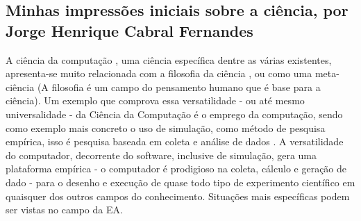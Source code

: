 \subsection{Minhas impressões iniciais sobre a ciência, por Jorge Henrique Cabral Fernandes}

A ciência da computação \citep{baldwin_three-fold_1994}, uma ciência específica dentre as várias existentes, apresenta-se muito relacionada com a filosofia da ciência \citep{floridi_blackwell_2004}, ou como uma meta-ciência (A filosofia é um campo do pensamento humano que é base para a ciência). Um exemplo que comprova essa versatilidade - ou até mesmo universalidade - da Ciência da Computação é o emprego da computação, sendo como exemplo mais concreto o uso de simulação, como método de pesquisa empírica, isso é pesquisa baseada em coleta e análise de dados \cite{marcolino_a_2014,tedre_experiments_2014}. A versatilidade do computador, decorrente do software, inclusive de simulação, gera uma plataforma empírica - o computador é prodigioso na coleta, cálculo e geração de dado - para o desenho e execução de quase todo tipo de experimento científico em quaisquer dos outros campos do conhecimento. Situações mais específicas podem ser vistas no campo da \gls{EA}.
